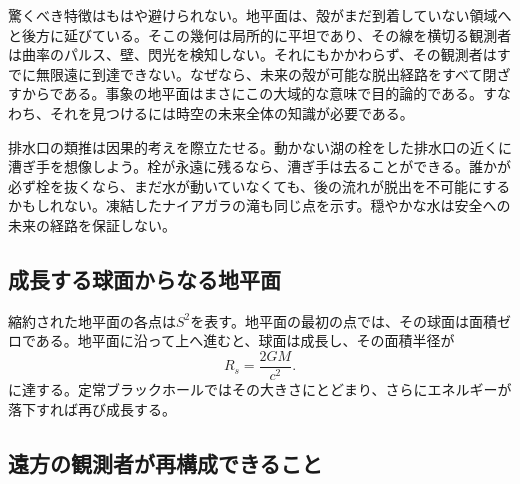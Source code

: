 驚くべき特徴はもはや避けられない。地平面は、殻がまだ到着していない領域へと後方に延びている。そこの幾何は局所的に平坦であり、その線を横切る観測者は曲率のパルス、壁、閃光を検知しない。それにもかかわらず、その観測者はすでに無限遠に到達できない。なぜなら、未来の殻が可能な脱出経路をすべて閉ざすからである。事象の地平面はまさにこの大域的な意味で目的論的である。すなわち、それを見つけるには時空の未来全体の知識が必要である。

排水口の類推は因果的考えを際立たせる。動かない湖の栓をした排水口の近くに漕ぎ手を想像しよう。栓が永遠に残るなら、漕ぎ手は去ることができる。誰かが必ず栓を抜くなら、まだ水が動いていなくても、後の流れが脱出を不可能にするかもしれない。凍結したナイアガラの滝も同じ点を示す。穏やかな水は安全への未来の経路を保証しない。

\begin{classroomqa}
\end{classroomqa}

\subsection{成長する球面からなる地平面}

縮約された地平面の各点は\(S^2\)を表す。地平面の最初の点では、その球面は面積ゼロである。地平面に沿って上へ進むと、球面は成長し、その面積半径が
\begin{equation}
R_s=\frac{2GM}{c^2}.
\end{equation}
に達する。定常ブラックホールではその大きさにとどまり、さらにエネルギーが落下すれば再び成長する。


\subsection{遠方の観測者が再構成できること}

